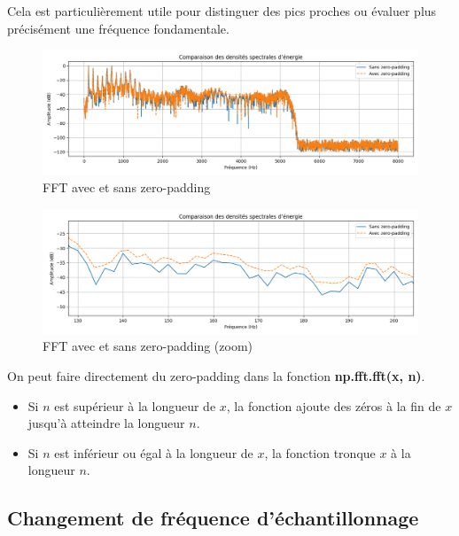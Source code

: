 Cela est particulièrement utile pour distinguer des pics proches ou évaluer plus précisément une fréquence fondamentale.

\begin{figure}[h!]
    \centering
    \includegraphics[width=17cm]{screenshots/fft_avec_zero_padding.png}
    \caption{FFT avec et sans zero-padding}
\end{figure}

\begin{figure}[h!]
    \centering
    \includegraphics[width=17cm]{screenshots/fft_avec_zero_padding_zoom.png}
    \caption{FFT avec et sans zero-padding (zoom)}
    \label{fig:fft_zero_padding_zoom}
\end{figure}

\newpage
On peut faire directement du zero-padding dans la fonction \textbf{np.fft.fft(x, n)}.

\begin{itemize}
    \item Si \( n \) est supérieur à la longueur de \( x \), la fonction ajoute des zéros à la fin de \( x \) jusqu'à atteindre la longueur \( n \).
    \item Si \( n \) est inférieur ou égal à la longueur de \( x \), la fonction tronque \( x \) à la longueur \( n \).
\end{itemize}

\subsection{Changement de fréquence d’échantillonnage}